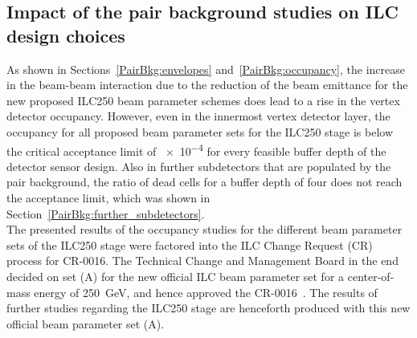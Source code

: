 \subsection{Impact of the pair background studies on ILC design choices}
As shown in Sections~\ref{PairBkg:envelopes} and~\ref{PairBkg:occupancy}, the increase in the beam-beam interaction due to the reduction of the beam emittance for the new proposed ILC250 beam parameter schemes does lead to a rise in the \sid vertex detector occupancy.
However, even in the innermost vertex detector layer, the occupancy for all proposed beam parameter sets for the ILC250 stage is below the critical acceptance limit of \num{e-4} for every feasible buffer depth of the detector sensor design.
Also in further \sid subdetectors that are populated by the pair background, the ratio of dead cells for a buffer depth of four does not reach the acceptance limit, which was shown in Section~\ref{PairBkg:further_subdetectors}.
\\The presented results of the \sid occupancy studies for the different beam parameter sets of the ILC250 stage were factored into the ILC Change Request (CR) process for CR-0016.
The Technical Change and Management Board in the end decided on set (A) for the new official ILC beam parameter set for a center-of-mass energy of \SI{250}{\GeV}, and hence approved the CR-0016~\cite{LCWS17_TCMBmeeting,CR-0016}.
The results of further studies regarding the ILC250 stage are henceforth produced with this new official beam parameter set (A).


